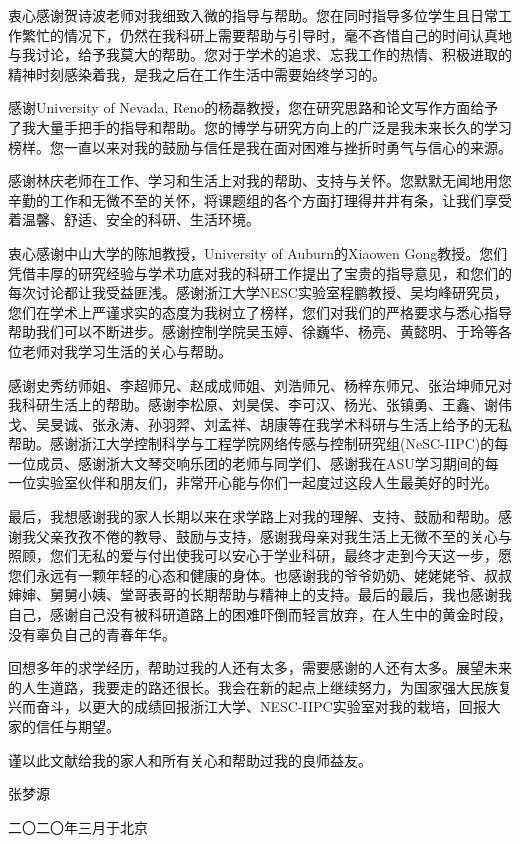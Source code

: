 \begin{thanks}
衷心感谢贺诗波老师对我细致入微的指导与帮助。您在同时指导多位学生且日常工作繁忙的情况下，仍然在我科研上需要帮助与引导时，毫不吝惜自己的时间认真地与我讨论，给予我莫大的帮助。您对于学术的追求、忘我工作的热情、积极进取的精神时刻感染着我，是我之后在工作生活中需要始终学习的。

感谢University of Nevada, Reno的杨磊教授，您在研究思路和论文写作方面给予了我大量手把手的指导和帮助。您的博学与研究方向上的广泛是我未来长久的学习榜样。您一直以来对我的鼓励与信任是我在面对困难与挫折时勇气与信心的来源。


感谢林庆老师在工作、学习和生活上对我的帮助、支持与关怀。您默默无闻地用您辛勤的工作和无微不至的关怀，将课题组的各个方面打理得井井有条，让我们享受着温馨、舒适、安全的科研、生活环境。

衷心感谢中山大学的陈旭教授，University of Auburn的Xiaowen Gong教授。您们凭借丰厚的研究经验与学术功底对我的科研工作提出了宝贵的指导意见，和您们的每次讨论都让我受益匪浅。感谢浙江大学NESC实验室程鹏教授、吴均峰研究员，您们在学术上严谨求实的态度为我树立了榜样，您们对我们的严格要求与悉心指导帮助我们可以不断进步。感谢控制学院吴玉婷、徐巍华、杨亮、黄懿明、于玲等各位老师对我学习生活的关心与帮助。

感谢史秀纺师姐、李超师兄、赵成成师姐、刘浩师兄、杨梓东师兄、张治坤师兄对我科研生活上的帮助。感谢李松原、刘昊俣、李可汉、杨光、张镇勇、王鑫、谢伟戈、吴旻诚、张永涛、孙羽羿、刘孟祥、胡康等在我学术科研与生活上给予的无私帮助。感谢浙江大学控制科学与工程学院网络传感与控制研究组(NeSC-IIPC)的每一位成员、感谢浙大文琴交响乐团的老师与同学们、感谢我在ASU学习期间的每一位实验室伙伴和朋友们，非常开心能与你们一起度过这段人生最美好的时光。

最后，我想感谢我的家人长期以来在求学路上对我的理解、支持、鼓励和帮助。感谢我父亲孜孜不倦的教导、鼓励与支持，感谢我母亲对我生活上无微不至的关心与照顾，您们无私的爱与付出使我可以安心于学业科研，最终才走到今天这一步，愿您们永远有一颗年轻的心态和健康的身体。也感谢我的爷爷奶奶、姥姥姥爷、叔叔婶婶、舅舅小姨、堂哥表哥的长期帮助与精神上的支持。最后的最后，我也感谢我自己，感谢自己没有被科研道路上的困难吓倒而轻言放弃，在人生中的黄金时段，没有辜负自己的青春年华。


回想多年的求学经历，帮助过我的人还有太多，需要感谢的人还有太多。展望未来的人生道路，我要走的路还很长。我会在新的起点上继续努力，为国家强大民族复兴而奋斗，以更大的成绩回报浙江大学、NESC-IIPC实验室对我的栽培，回报大家的信任与期望。

谨以此文献给我的家人和所有关心和帮助过我的良师益友。

	\begin{flushright}
		{张梦源}
		
		{二〇二〇年三月于北京}
	\end{flushright}
\end{thanks}
